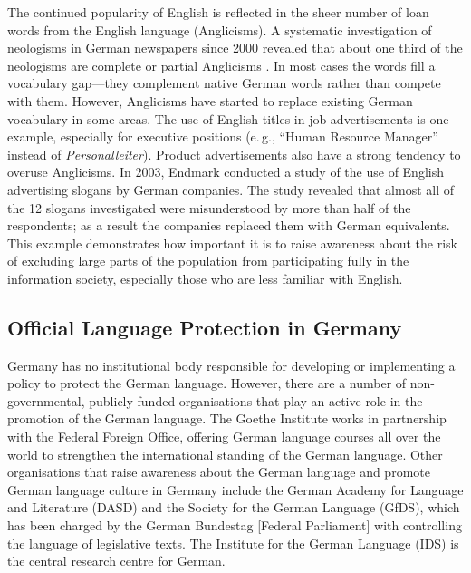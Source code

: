 \documentclass[]{../../metanetpaper}
\begin{document}
\begin{multicols}{2}
The continued popularity of English is reflected in the sheer number of loan words from the English language (Anglicisms). A systematic investigation of neologisms in German newspapers since 2000 revealed that about one third of the neologisms are complete or partial Anglicisms \cite{Lemni1}. In most cases the words fill a vocabulary gap—they complement native German words rather than compete with them. However, Anglicisms have started to replace existing German vocabulary in some areas. The use of English titles in job advertisements is one example, especially for executive positions (e.\,g., “Human Resource Manager” instead of \textit{Personalleiter}). Product advertisements also have a strong tendency to overuse Anglicisms. In 2003, Endmark conducted a study of the use of English advertising slogans by German companies. The study revealed that almost all of the 12 slogans investigated were misunderstood by more than half of the respondents; as a result the companies replaced them with German equivalents. This example demonstrates how important it is to raise awareness about the risk of excluding large parts of the population from participating fully in the information society, especially those who are less familiar with English.

\subsection{Official Language Protection in Germany}

Germany has no institutional body responsible for developing or implementing a policy to protect the German language. However, there are a number of non-governmental, publicly-funded organisations that play an active role in the promotion of the German language. The Goethe Institute works in partnership with the Federal Foreign Office, offering German language courses all over the world to strengthen the international standing of the German language. Other organisations that raise awareness about the German language and promote German language culture in Germany include the German Academy for Language and Literature (DASD) and the Society for the German Language (GfDS), which has been charged by the German Bundestag [Federal Parliament] with controlling the language of legislative texts. The Institute for the German Language (IDS) is the central research centre for German. 



\end{multicols}
\end{document}
